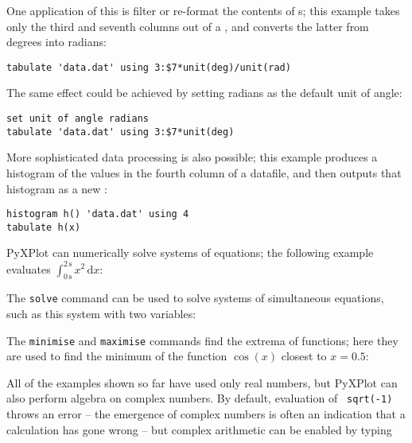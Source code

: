 \noindent One application of this is filter or re-format the contents of
\datafile s; this example takes only the third and seventh columns out of a
\datafile, and converts the latter from degrees into radians:

\begin{verbatim}
tabulate 'data.dat' using 3:$7*unit(deg)/unit(rad)
\end{verbatim}

\noindent The same effect could be achieved by setting radians as the default
unit of angle:

\begin{verbatim}
set unit of angle radians
tabulate 'data.dat' using 3:$7*unit(deg)
\end{verbatim}

\noindent More sophisticated data processing is also possible; this example
produces a histogram of the values in the fourth column of a datafile, and then
outputs that histogram as a new \datafile:

\begin{verbatim}
histogram h() 'data.dat' using 4
tabulate h(x)
\end{verbatim}


PyXPlot can numerically solve systems of equations; the following example
evaluates $\int_{0\,\mathrm{s}}^{2\,\mathrm{s}} x^2\,\mathrm{d}x$:

\vspace{3mm}

\vspace{3mm}

\noindent The {\tt solve} command can be used to solve systems of simultaneous equations, such as this system with two variables:

\vspace{3mm}

\vspace{3mm}

\noindent The {\tt minimise} and {\tt maximise} commands find the extrema of functions; here they are used to find the minimum of the function $\cos(x)$ closest to $x=0.5$:

\vspace{3mm}

\vspace{3mm}

All of the examples shown so far have used only real numbers, but PyXPlot can
also perform algebra on complex numbers. By default, evaluation of {\tt
sqrt(-1)} throws an error -- the emergence of complex numbers is often an
indication that a calculation has gone wrong -- but complex arithmetic can be
enabled by typing

